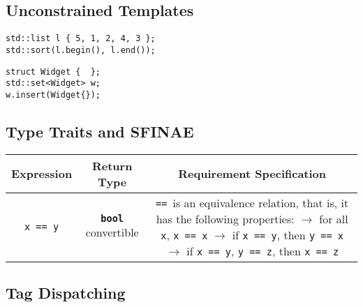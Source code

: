 





\subsection{Unconstrained Templates} \label{sec:unconstrained_templates}



\begin{lstlisting}
std::list l { 5, 1, 2, 4, 3 };
std::sort(l.begin(), l.end());
\end{lstlisting}

\begin{lstlisting}
struct Widget {  };
std::set<Widget> w;
w.insert(Widget{});
\end{lstlisting}



\subsection{Type Traits and SFINAE} \label{sec:type_traits_and_sfinae}

\begin{table}[h]
\begin{tabular}{ccc}
    \toprule
    \bf{Expression} & \bf{Return Type} & \bf{Requirement Specification} \\
    \midrule
    \texttt{x == y} & \textbf{\texttt{bool}} convertible & \makecell[l]{\texttt{==}\, is an equivalence relation, that is,\\
                                                               it has the following properties:\\
                                                               $\rightarrow$ for all \texttt{x}, \texttt{x == x}\\
                                                               $\rightarrow$ if \texttt{x == y}, then \texttt{y == x}\\
                                                               $\rightarrow$ if \texttt{x == y}, \texttt{y == z}, then \texttt{x == z}} \\
    \bottomrule
\end{tabular}
\end{table}











\subsection{Tag Dispatching} \label{sec:tag_dispatching}
